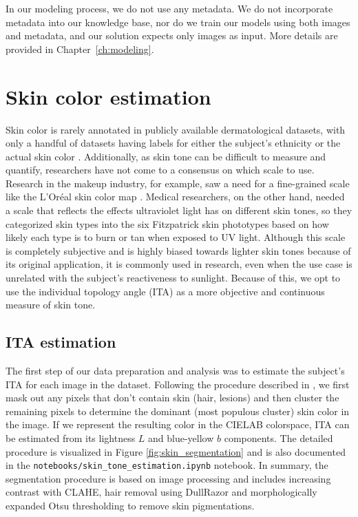 In our modeling process, we do not use any metadata. We do not incorporate metadata into our knowledge base, nor do we train our models using both images and metadata, and our solution expects only images as input. More details are provided in Chapter~\ref{ch:modeling}.

\section{Skin color estimation}
Skin color is rarely annotated in publicly available dermatological datasets, with only a handful of datasets having labels for either the subject's ethnicity or the actual skin color \cite{skin_color_labels}. Additionally, as skin tone can be difficult to measure and quantify, researchers have not come to a consensus on which scale to use. Research in the makeup industry, for example, saw a need for a fine-grained scale like the L'Oréal skin color map \cite{loreal_chart, accel_fairness}. Medical researchers, on the other hand, needed a scale that reflects the effects ultraviolet light has on different skin tones, so they categorized skin types into the six Fitzpatrick skin phototypes \cite{fitzy} based on how likely each type is to burn or tan when exposed to UV light. Although this scale is completely subjective and is highly biased towards lighter skin tones because of its original application, it is commonly used in research, even when the use case is unrelated with the subject's reactiveness to sunlight. Because of this, we opt to use the individual topology angle (ITA) as a more objective and continuous measure of skin tone. 

\subsection{ITA estimation}
The first step of our data preparation and analysis was to estimate the subject's ITA for each image in the dataset. Following the procedure described in \cite{skin_color_bias_ferit}, we first mask out any pixels that don't contain skin (hair, lesions) and then cluster the remaining pixels to determine the dominant (most populous cluster) skin color in the image. If we represent the resulting color in the CIELAB colorspace, ITA can be estimated from its lightness $L$ and blue-yellow $b$ components. The detailed procedure is visualized in Figure \ref{fig:skin_segmentation} and is also documented in the  \lstinline{notebooks/skin_tone_estimation.ipynb} notebook. In summary, the segmentation procedure is based on image processing and includes increasing contrast with CLAHE, hair removal using DullRazor \cite{dullrazor} and morphologically expanded Otsu thresholding to remove skin pigmentations. 

